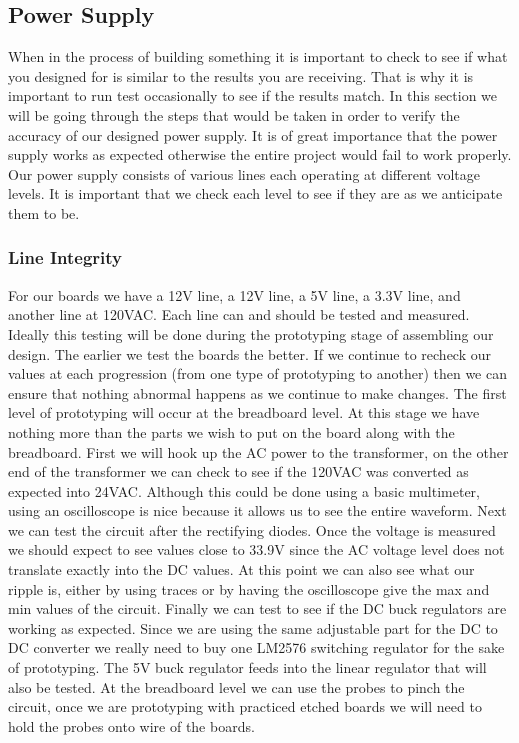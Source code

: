 \subsection{Power Supply}
When in the process of building something it is important to check to see if
what you designed for is similar to the results you are receiving. That is why
it is important to run test occasionally to see if the results match. In this
section we will be going through the steps that would be taken in order to
verify the accuracy of our designed power supply. It is of great importance
that the power supply works as expected otherwise the entire project would fail
to work properly. Our power supply consists of various lines each operating at
different voltage levels. It is important that we check each level to see if
they are as we anticipate them to be.

\subsubsection{Line Integrity}
For our boards we have a 12V line, a 12V line, a 5V line, a 3.3V line, and
another line at 120VAC. Each line can and should be tested and measured.
Ideally this testing will be done during the prototyping stage of assembling
our design.  The earlier we test the boards the better. If we continue to
recheck our values at each progression (from one type of prototyping to
another) then we can ensure that nothing abnormal happens as we continue to
make changes. The first level of prototyping will occur at the breadboard
level. At this stage we have nothing more than the parts we wish to put on the
board along with the breadboard. First we will hook up the AC power to the
transformer, on the other end of the transformer we can check to see if the
120VAC was converted as expected into 24VAC. Although this could be done using
a basic multimeter, using an oscilloscope is nice because it allows us to see
the entire waveform. Next we can test the circuit after the rectifying diodes.
Once the voltage is measured we should expect to see values close to 33.9V
since the AC voltage level does not translate exactly into the DC values. At
this point we can also see what our ripple is, either by using traces or by
having the oscilloscope give the max and min values of the circuit. Finally we
can test to see if the DC buck regulators are working as expected. Since we are
using the same adjustable part for the DC to DC converter we really need to buy
one LM2576 switching regulator for the sake of prototyping. The 5V buck
regulator feeds into the linear regulator that will also be tested. At the
breadboard level we can use the probes to pinch the circuit, once we are
prototyping with practiced etched boards we will need to hold the probes onto
wire of the boards.

